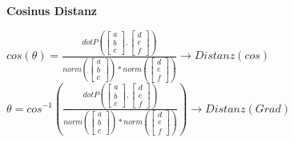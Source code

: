 \textbf{Cosinus Distanz}
\begin{center}
    $cos(\theta) = \frac{dotP\left(\begin{bmatrix}a \\ b\\ c\end{bmatrix}, \begin{bmatrix}d \\ e \\ f\end{bmatrix}\right)}{norm\left(\begin{bmatrix}a \\ b\\ c\end{bmatrix}\right) * norm\left(\begin{bmatrix}d \\ e\\ f\end{bmatrix}\right)} \rightarrow Distanz (cos)$\\
    $\theta = cos^{-1}\left(\frac{dotP\left(\begin{bmatrix}a \\ b\\ c\end{bmatrix}, \begin{bmatrix}d \\ e \\ f\end{bmatrix}\right)}{norm\left(\begin{bmatrix}a \\ b\\ c\end{bmatrix}\right) * norm\left(\begin{bmatrix}d \\ e\\ f\end{bmatrix}\right)}\right) \rightarrow Distanz (Grad)$
\end{center}
